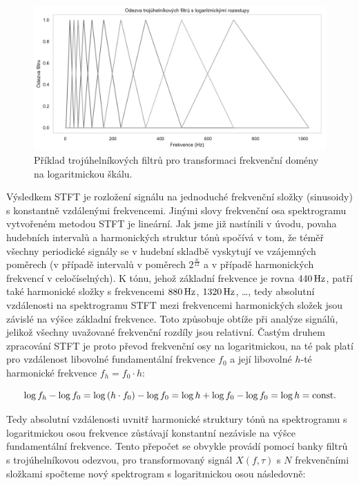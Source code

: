 \begin{figure}[h]\centering
\includegraphics[width=\textwidth,height=\textheight,keepaspectratio]{../img/stft_triangular_filters_grey}
\caption{Příklad trojúhelníkových filtrů pro transformaci frekvenční domény na logaritmickou škálu.}
\label{obr:stft_triangular_filters}
\end{figure}

Výsledkem STFT je rozložení signálu na jednoduché frekvenční složky (sinusoidy) s konstantně vzdálenými frekvencemi. Jinými slovy frekvenční osa spektrogramu vytvořeném metodou STFT je lineární. Jak jsme již nastínili v úvodu, povaha hudebních intervalů a harmonických struktur tónů spočívá v tom, že téměř všechny periodické signály se v hudební skladbě vyskytují ve vzájemných poměrech (v případě intervalů v poměrech $2^{\frac{n}{12}}$ a v případě harmonických frekvencí v celočíselných). K tónu, jehož základní frekvence je rovna $440\,\rm Hz$, patří také harmonické složky s frekvencemi $880\,\rm Hz$, $1320\,\rm Hz$, \dots, tedy absolutní vzdálenosti na spektrogramu STFT mezi frekvencemi harmonických složek jsou závislé na výšce základní frekvence. Toto způsobuje obtíže při analýze signálů, jelikož všechny uvažované frekvenční rozdíly jsou relativní. Častým druhem zpracování STFT je proto převod frekvenční osy na logaritmickou, na té pak platí pro vzdálenost libovolné fundamentální frekvence $f_0$ a její libovolné $h$-té harmonické frekvence $f_h = f_0 \cdot h$:

$$ \log{f_h} - \log{f_0} = \log{(h \cdot f_0)} - \log{f_0} = \log{h} + \log{f_0} - \log{f_0} = \log{h} = \rm const.$$

Tedy absolutní vzdálenosti uvnitř harmonické struktury tónů na spektrogramu s logaritmickou osou frekvence zůstávají konstantní nezávisle na výšce fundamentální frekvence. Tento přepočet se obvykle provádí pomocí banky filtrů s trojúhelníkovou odezvou, pro transformovaný signál $X(f, \tau)$ s $N$ frekvenčními složkami spočteme nový spektrogram s logaritmickou osou následovně:

